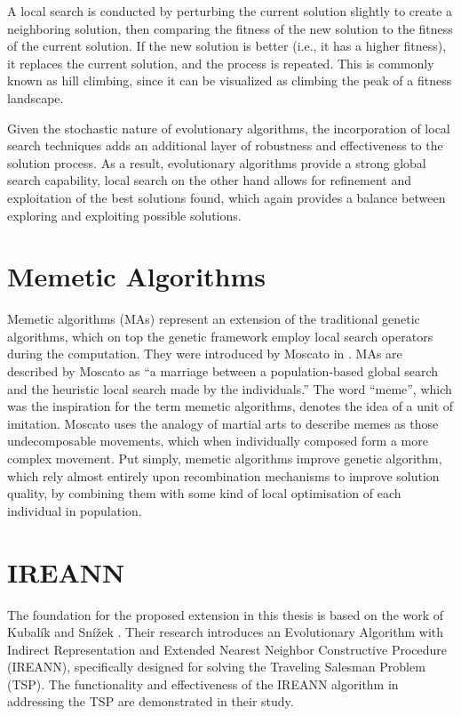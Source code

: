 \documentclass[twoside]{ctuthesis}
\theoremstyle{plain}
\theoremstyle{definition}
\theoremstyle{note}
\begin{document}
A local search is conducted by perturbing the current solution slightly to create a neighboring solution, then comparing the fitness of the new solution to the fitness of the current solution. If the new solution is better (i.e., it has a higher fitness), it replaces the current solution, and the process is repeated. This is commonly known as hill climbing, since it can be visualized as climbing the peak of a fitness landscape.

Given the stochastic nature of evolutionary algorithms, the incorporation of local search techniques adds an additional layer of robustness and effectiveness to the solution process. As a result, evolutionary algorithms provide a strong global search capability, local search on the other hand allows for refinement and exploitation of the best solutions found, which again provides a balance between exploring and exploiting possible solutions.

\section{Memetic Algorithms}
\label{sec:memetic}
Memetic algorithms (MAs) represent an extension of the traditional genetic algorithms, which on top the genetic framework employ local search operators during the computation. They were introduced by Moscato in \cite{moscato1989evolution}. MAs are described by Moscato as ``a marriage between a population-based global search and the heuristic local search made by the individuals.'' The word ``meme'', which was the inspiration for the term memetic algorithms, denotes the idea of a unit of imitation. Moscato uses the analogy of martial arts to describe memes as those undecomposable movements, which when individually composed form a more complex movement. Put simply, memetic algorithms improve genetic algorithm, which rely almost entirely upon recombination mechanisms to improve solution quality, by combining them with some kind of local optimisation of each individual in population. 

\section{IREANN}
The foundation for the proposed extension in this thesis is based on the work of Kubalík and Snížek \cite{kubalik2014novel}. Their research introduces an Evolutionary Algorithm with Indirect Representation and Extended Nearest Neighbor Constructive Procedure (IREANN), specifically designed for solving the Traveling Salesman Problem (TSP). The functionality and effectiveness of the IREANN algorithm in addressing the TSP are demonstrated in their study.
\end{document}
